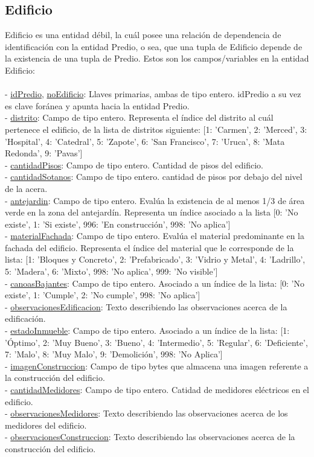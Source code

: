 \subsection{Edificio}
Edificio es una entidad débil, la cuál posee una relación de dependencia de identificación con la entidad Predio, o sea, que una tupla de Edificio depende de la existencia de una tupla de Predio.
Estos son los campos/variables en la entidad Edificio:\\\\
- \underline{idPredio}, \underline{noEdificio}: Llaves primarias, ambas de tipo entero. idPredio a su vez es clave foránea y apunta hacia la entidad Predio.\\
- \underline{distrito}: Campo de tipo entero. Representa el índice del distrito al cuál pertenece el edificio, de la lista de distritos siguiente: [1: 'Carmen', 2: 'Merced', 3: 'Hospital', 4: 'Catedral', 5: 'Zapote', 6: 'San Francisco', 7: 'Uruca', 8: 'Mata Redonda', 9: 'Pavas']\\
- \underline{cantidadPisos}: Campo de tipo entero. Cantidad de pisos del edificio.\\
- \underline{cantidadSotanos}: Campo de tipo entero. cantidad de pisos por debajo del nivel de la acera.\\
- \underline{antejardin}: Campo de tipo entero. Evalúa la existencia de al menos 1/3 de área verde en la zona del antejardín. Representa un índice asociado a la lista [0: 'No existe', 1: 'Si existe', 996: 'En construcción', 998: 'No aplica']\\
- \underline{materialFachada}: Campo de tipo entero. Evalúa el material predominante en la fachada del edificio. Representa el índice del material que le corresponde de la lista: [1: 'Bloques y Concreto', 2: 'Prefabricado', 3: 'Vidrio y Metal', 4: 'Ladrillo', 5: 'Madera', 6: 'Mixto', 998: 'No aplica', 999: 'No visible']\\
- \underline{canoasBajantes}: Campo de tipo entero. Asociado a un índice de la lista: [0: 'No existe', 1: 'Cumple', 2: 'No cumple', 998: 'No aplica']\\
- \underline{observacionesEdificacion}: Texto describiendo las observaciones acerca de la edificación.\\
- \underline{estadoInmueble}: Campo de tipo entero. Asociado a un índice de la lista: [1: 'Óptimo', 2: 'Muy Bueno', 3: 'Bueno', 4: 'Intermedio', 5: 'Regular', 6: 'Deficiente', 7: 'Malo', 8: 'Muy Malo', 9: 'Demolición', 998: 'No Aplica']\\
- \underline{imagenConstruccion}: Campo de tipo bytes que almacena una imagen referente a la construcción del edificio.\\
- \underline{cantidadMedidores}: Campo de tipo entero. Catidad de medidores eléctricos en el edificio.\\
- \underline{observacionesMedidores}: Texto describiendo las observaciones acerca de los medidores del edificio.\\
- \underline{observacionesConstruccion}: Texto describiendo las observaciones acerca de la construcción del edificio.\\
